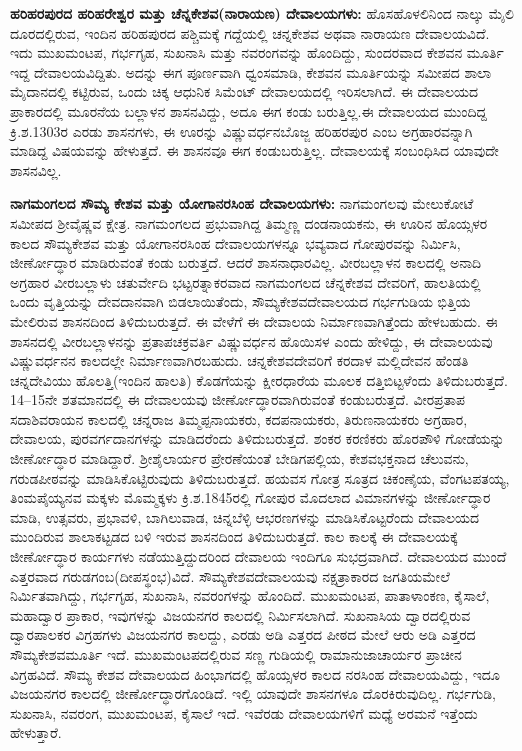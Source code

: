\textbf{ಹರಿಹರಪುರದ ಹರಿಹರೇಶ್ವರ ಮತ್ತು ಚೆನ್ನಕೇಶವ(ನಾರಾಯಣ) ದೇವಾಲಯಗಳು:} ಹೊಸಹೊಳಲಿನಿಂದ ನಾಲ್ಕು ಮೈಲಿ ದೂರದಲ್ಲಿರುವ, ಇಂದಿನ ಹರಿಹಪುರದ ಪಶ್ಚಿಮಕ್ಕೆ ಗದ್ದೆಯಲ್ಲಿ ಚನ್ನಕೇಶವ ಅಥವಾ ನಾರಾಯಣ ದೇವಾಲಯವಿದೆ. ಇದು ಮುಖಮಂಟಪ, ಗರ್ಭಗೃಹ, ಸುಖನಾಸಿ ಮತ್ತು ನವರಂಗವನ್ನು ಹೊಂದಿದ್ದು, ಸುಂದರವಾದ ಕೇಶವನ ಮೂರ್ತಿ ಇದ್ದ ದೇವಾಲಯವಿದ್ದಿತು. ಅದನ್ನು ಈಗ ಪೂರ್ಣವಾಗಿ ಧ್ವಂಸಮಾಡಿ, ಕೇಶವನ ಮೂರ್ತಿಯನ್ನು ಸಮೀಪದ ಶಾಲಾ ಮೈದಾನದಲ್ಲಿ ಕಟ್ಟಿರುವ, ಒಂದು ಚಿಕ್ಕ ಆಧುನಿಕ ಸಿಮೆಂಟ್​ ದೇವಾಲಯದಲ್ಲಿ ಇರಿಸಲಾಗಿದೆ. ಈ ದೇವಾಲಯದ ಪ್ರಾಕಾರದಲ್ಲಿ ಮೂರನೆಯ ಬಲ್ಲಾಳನ ಶಾಸನವಿದ್ದು, ಅದೂ ಈಗ ಕಂಡು ಬರುತ್ತಿಲ್ಲ.ಈ ದೇವಾಲಯದ ಮುಂದಿದ್ದ ಕ್ರಿ.ಶ.1303ರ ಎರಡು ಶಾಸನಗಳು, ಈ ಊರನ್ನು ವಿಷ್ಣುವರ್ಧನಬೊಜ್ಜ ಹರಿಹರಪುರ ಎಂಬ ಅಗ್ರಹಾರವನ್ನಾಗಿ ಮಾಡಿದ್ದ ವಿಷಯವನ್ನು ಹೇಳುತ್ತದೆ. ಈ ಶಾಸನವೂ ಈಗ ಕಂಡುಬರುತ್ತಿಲ್ಲ. ದೇವಾಲಯಕ್ಕೆ ಸಂಬಂಧಿಸಿದ ಯಾವುದೇ ಶಾಸನವಿಲ್ಲ. 

\textbf{ನಾಗಮಂಗಲದ ಸೌಮ್ಯ ಕೇಶವ ಮತ್ತು ಯೋಗಾನರಸಿಂಹ ದೇವಾಲಯಗಳು:} ನಾಗಮಂಗಲವು ಮೇಲುಕೋಟೆ ಸಮೀಪದ ಶ‍್ರೀವೈಷ್ಣವ ಕ್ಷೇತ್ರ. ನಾಗಮಂಗಲದ ಪ್ರಭುವಾಗಿದ್ದ ತಿಮ್ಮಣ್ಣ ದಂಡನಾಯಕನು, ಈ ಊರಿನ ಹೊಯ್ಸಳರ ಕಾಲದ ಸೌಮ್ಯಕೇಶವ ಮತ್ತು ಯೋಗಾನರಸಿಂಹ ದೇವಾಲಯಗಳನ್ನೂ ಭವ್ಯವಾದ ಗೋಪುರವನ್ನು ನಿರ್ಮಿಸಿ, ಜೀರ್ಣೋದ್ಧಾರ ಮಾಡಿರುವಂತೆ ಕಂಡು ಬರುತ್ತದೆ. ಆದರೆ ಶಾಸನಾಧಾರವಿಲ್ಲ. ವೀರಬಲ್ಲಾಳನ ಕಾಲದಲ್ಲಿ ಅನಾದಿ ಅಗ್ರಹಾರ ವೀರಬಲ್ಲಾಳು ಚತುರ್ವೇದಿ ಭಟ್ಟರತ್ನಾಕರವಾದ ನಾಗಮಂಗಲದ ಚೆನ್ನಕೇಶವ ದೇವರಿಗೆ, ಹಾಲತಿಯಲ್ಲಿ ಒಂದು ವೃತ್ತಿಯನ್ನು ದೇವದಾನವಾಗಿ ಬಿಡಲಾಯಿತೆಂದು, ಸೌಮ್ಯಕೇಶವದೇವಾಲಯದ ಗರ್ಭಗುಡಿಯ ಭಿತ್ತಿಯ ಮೇಲಿರುವ ಶಾಸನದಿಂದ ತಿಳಿದುಬರುತ್ತದೆ. ಈ ವೇಳೆಗೆ ಈ ದೇವಾಲಯ ನಿರ್ಮಾಣವಾಗಿತ್ತೆಂದು ಹೇಳಬಹುದು. ಈ ಶಾಸನದಲ್ಲಿ ವೀರಬಲ್ಲಾಳನನ್ನು ಪ್ರತಾಪಚಕ್ರವರ್ತಿ ವಿಷ್ಣುವರ್ಧನ ಹೊಯಿಸಳ ಎಂದು ಹೇಳಿದ್ದು, ಈ ದೇವಾಲಯವು ವಿಷ್ಣುವರ್ಧನನ ಕಾಲದಲ್ಲೇ ನಿರ್ಮಾಣವಾಗಿರಬಹುದು. ಚನ್ನಕೇಶವದೇವರಿಗೆ ಕರದಾಳ ಮಲ್ಲಿದೇವನ ಹೆಂಡತಿ ಚನ್ನದೇವಿಯು ಹೊಲತ್ತಿ(ಇಂದಿನ ಹಾಲತಿ) ಕೊಡಗೆಯನ್ನು ಕ್ಷೀರಧಾರೆಯ ಮೂಲಕ ದತ್ತಿಬಿಟ್ಟಳೆಂದು ತಿಳಿದುಬರುತ್ತದೆ. 14–15ನೇ ಶತಮಾನದಲ್ಲಿ ಈ ದೇವಾಲಯವು ಜೀರ್ಣೋದ್ಧಾರವಾಗಿರುವಂತೆ ಕಂಡುಬರುತ್ತದೆ. ವೀರಪ್ರತಾಪ ಸದಾಶಿವರಾಯನ ಕಾಲದಲ್ಲಿ ಚನ್ನರಾಜ ತಿಮ್ಮಪ್ಪನಾಯಕರು, ಕದಪನಾಯಕರು, ತಿರುಣನಾಯಕರು ಅಗ್ರಹಾರ, ದೇವಾಲಯ, ಪುರವರ್ಗದಾನಗಳನ್ನು ಮಾಡಿದರೆಂದು ತಿಳಿದುಬರುತ್ತದೆ. ಶಂಕರ ಕರಣಿಕರು ಹೊರಪೌಳಿ ಗೋಡೆಯನ್ನು ಜೀರ್ಣೋದ್ಧಾರ ಮಾಡಿದ್ದಾರೆ. ಶ‍್ರೀಶೈಲಾರ್ಯರ ಪ್ರೇರಣೆಯಂತೆ ಬೇಡಿಗಪಲ್ಲಿಯ, ಕೇಶವಭಕ್ತನಾದ ಚೆಲುವನು, ಗರುಡಪೀಠವನ್ನು ಮಾಡಿಸಿಕೊಟ್ಟಿರುವುದು ತಿಳಿದುಬರುತ್ತದೆ. ಹಯವಸ ಗೋತ್ರ ಸೂತ್ರದ ಚಿಕಂಣೈಯ, ವೆಂಗಟಪತಯ್ಯ, ತಿಂಮಪೈಯ್ಯನವ ಮಕ್ಕಳು ಮೊಮ್ಮಕ್ಕಳು ಕ್ರಿ.ಶ.1845ರಲ್ಲಿ ಗೋಪುರ ಮೊದಲಾದ ವಿಮಾನಗಳನ್ನು ಜೀರ್ಣೋದ್ಧಾರ ಮಾಡಿ, ಉತ್ಸವರು, ಪ್ರಭಾವಳಿ, ಬಾಗಿಲುವಾಡ, ಚಿನ್ನಬೆಳ್ಳಿ ಆಭರಣಗಳನ್ನು ಮಾಡಿಸಿಕೊಟ್ಟರೆಂದು ದೇವಾಲಯದ ಮುಂದಿರುವ ಶಾಲಾಕಟ್ಟಡದ ಬಳಿ ಇರುವ ಶಾಸನದಿಂದ ತಿಳಿದುಬರುತ್ತದೆ. ಕಾಲ ಕಾಲಕ್ಕೆ ಈ ದೇವಾಲಯಕ್ಕೆ ಜೀರ್ಣೋದ್ಧಾರ ಕಾರ್ಯಗಳು ನಡೆಯುತ್ತಿದ್ದುದರಿಂದ ದೇವಾಲಯ ಇಂದಿಗೂ ಸುಭದ್ರವಾಗಿದೆ. ದೇವಾಲಯದ ಮುಂದೆ ಎತ್ತರವಾದ ಗರುಡಗಂಬ(ದೀಪಸ್ಥಂಭ)ವಿದೆ. ಸೌಮ್ಯಕೇಶವದೇವಾಲಯವು ನಕ್ಷತ್ರಾಕಾರದ ಜಗತಿಯಮೇಲೆ ನಿರ್ಮಿತವಾಗಿದ್ದು, ಗರ್ಭಗೃಹ, ಸುಖನಾಸಿ, ನವರಂಗಳನ್ನು ಹೊಂದಿದೆ. ಮುಖಮಂಟಪ, ಪಾತಾಳಾಂಕಣ, ಕೈಸಾಲೆ, ಮಹಾದ್ವಾರ ಪ್ರಾಕಾರ, ಇವುಗಳನ್ನು ವಿಜಯನಗರ ಕಾಲದಲ್ಲಿ ನಿರ್ಮಿಸಲಾಗಿದೆ. ಸುಖನಾಸಿಯ ದ್ವಾರದಲ್ಲಿರುವ ದ್ವಾರಪಾಲಕರ ವಿಗ್ರಹಗಳು ವಿಜಯನಗರ ಕಾಲದ್ದು, ಎರಡು ಅಡಿ ಎತ್ತರದ ಪೀಠದ ಮೇಲೆ ಆರು ಅಡಿ ಎತ್ತರದ ಸೌಮ್ಯಕೇಶವಮೂರ್ತಿ ಇದೆ. ಮುಖಮಂಟಪದಲ್ಲಿರುವ ಸಣ್ಣ ಗುಡಿಯಲ್ಲಿ ರಾಮಾನುಜಾಚಾರ್ಯರ ಪ್ರಾಚೀನ ವಿಗ್ರಹವಿದೆ. ಸೌಮ್ಯ ಕೇಶವ ದೇವಾಲಯದ ಹಿಂಭಾಗದಲ್ಲಿ ಹೊಯ್ಸಳರ ಕಾಲದ ನರಸಿಂಹ ದೇವಾಲಯವಿದ್ದು, ಇದೂ ವಿಜಯನಗರ ಕಾಲದಲ್ಲಿ ಜೀರ್ಣೋದ್ಧಾರಗೊಂಡಿದೆ. ಇಲ್ಲಿ ಯಾವುದೇ ಶಾಸನಗಳೂ ದೊರಕಿರುವುದಿಲ್ಲ. ಗರ್ಭಗುಡಿ, ಸುಖನಾಸಿ, ನವರಂಗ, ಮುಖಮಂಟಪ, ಕೈಸಾಲೆ ಇದೆ. ಇವೆರಡು ದೇವಾಲಯಗಳಿಗೆ ಮಧ್ಯೆ ಅರಮನೆ ಇತ್ತೆಂದು ಹೇಳುತ್ತಾರೆ.


